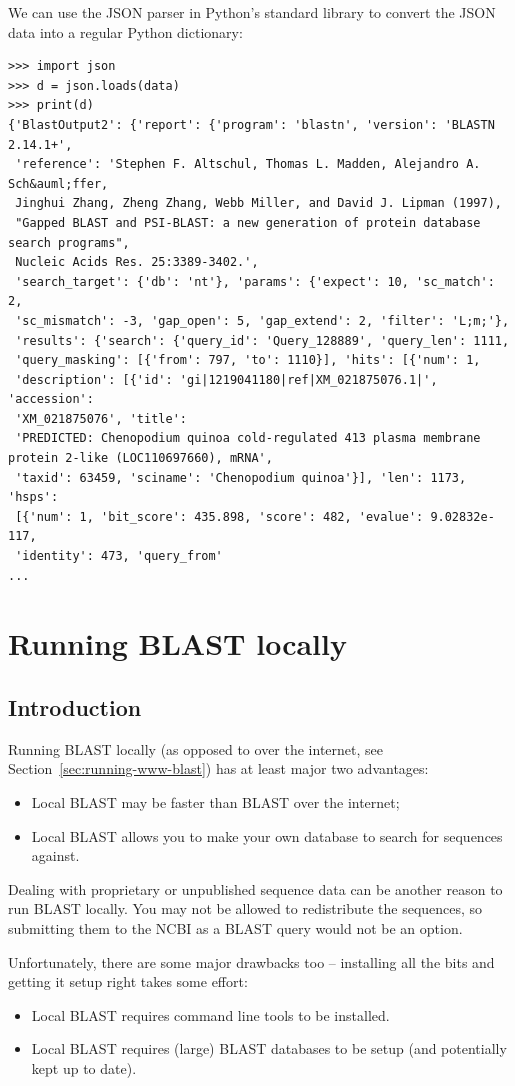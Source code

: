 We can use the JSON parser in Python's standard library to convert the JSON data into a regular Python dictionary:
\begin{verbatim}
>>> import json
>>> d = json.loads(data)
>>> print(d)
{'BlastOutput2': {'report': {'program': 'blastn', 'version': 'BLASTN 2.14.1+',
 'reference': 'Stephen F. Altschul, Thomas L. Madden, Alejandro A. Sch&auml;ffer,
 Jinghui Zhang, Zheng Zhang, Webb Miller, and David J. Lipman (1997),
 "Gapped BLAST and PSI-BLAST: a new generation of protein database search programs",
 Nucleic Acids Res. 25:3389-3402.',
 'search_target': {'db': 'nt'}, 'params': {'expect': 10, 'sc_match': 2,
 'sc_mismatch': -3, 'gap_open': 5, 'gap_extend': 2, 'filter': 'L;m;'},
 'results': {'search': {'query_id': 'Query_128889', 'query_len': 1111,
 'query_masking': [{'from': 797, 'to': 1110}], 'hits': [{'num': 1,
 'description': [{'id': 'gi|1219041180|ref|XM_021875076.1|', 'accession':
 'XM_021875076', 'title':
 'PREDICTED: Chenopodium quinoa cold-regulated 413 plasma membrane protein 2-like (LOC110697660), mRNA',
 'taxid': 63459, 'sciname': 'Chenopodium quinoa'}], 'len': 1173, 'hsps':
 [{'num': 1, 'bit_score': 435.898, 'score': 482, 'evalue': 9.02832e-117,
 'identity': 473, 'query_from'
...
\end{verbatim}


\section{Running BLAST locally}
\label{sec:running-local-blast}

\subsection{Introduction}

Running BLAST locally (as opposed to over the internet, see
Section~\ref{sec:running-www-blast}) has at least major two advantages:
\begin{itemize}
\item Local BLAST may be faster than BLAST over the internet;
\item Local BLAST allows you to make your own database to search for sequences against.
\end{itemize}
Dealing with proprietary or unpublished sequence data can be another reason to run BLAST
locally.  You may not be allowed to redistribute the sequences, so submitting them to the
NCBI as a BLAST query would not be an option.

Unfortunately, there are some major drawbacks too -- installing all the bits and getting
it setup right takes some effort:
\begin{itemize}
\item Local BLAST requires command line tools to be installed.
\item Local BLAST requires (large) BLAST databases to be setup (and potentially kept up to date).
\end{itemize}

